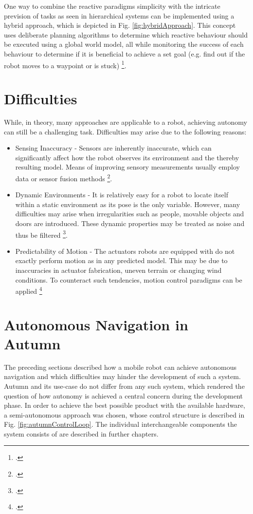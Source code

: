 One way to combine the reactive paradigms simplicity with the intricate prevision of tasks as seen in hierarchical systems can be implemented using a hybrid approach, which is depicted in Fig. \ref{fig:hybridApproach}. 
This concept uses deliberate planning algorithms to determine which reactive behaviour should be executed using a global world model, all while monitoring the success of each behaviour to determine if it is beneficial to achieve a set goal (e.g. find out if the robot moves to a waypoint or is stuck) \footcite{faigl2017controlParadigms}.

\section{Difficulties}
While, in theory, many approaches are applicable to a robot, achieving autonomy can still be a challenging task. Difficulties may arise due to the following reasons:
\begin{itemize}
	\item Sensing Inaccuracy - Sensors are inherently inaccurate, which can significantly affect how the robot observes its environment and the thereby resulting model. Means of improving sensory measurements usually employ data or sensor fusion methods \footcite[Page 585]{siciliano2008springer}.
	\item Dynamic Environments - It is relatively easy for a robot to locate itself within a static environment as its pose is the only variable. However, many difficulties may arise when irregularities such as people, movable objects and doors are introduced. These dynamic properties may be treated as noise and thus be filtered \footcite[Pages 159 - 162]{thrun2002probabilisticRobotics}.
	\item Predictability of Motion - The actuators robots are equipped with do not exactly perform motion as in any predicted model. This may be due to inaccuracies in actuator fabrication, uneven terrain or changing wind conditions. To counteract such tendencies, motion control paradigms can be applied \footcite[Page 133]{siciliano2008springer}
\end{itemize}

\section{Autonomous Navigation in Autumn}\label{autumnControlLoop}
The preceding sections described how a mobile robot can achieve autonomous navigation and which difficulties may hinder the development of such a system. Autumn and its use-case do not differ from any such system, which rendered the question of how autonomy is achieved a central concern during the development phase. 
In order to achieve the best possible product with the available hardware, a semi-autonomous approach was chosen, whose control structure is described in Fig. \ref{fig:autumnControlLoop}.
The individual interchangeable components the system consists of are described in further chapters.

